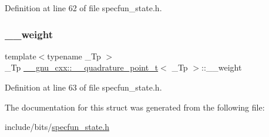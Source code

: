 Definition at line 62 of file specfun\+\_\+state.\+h.

\mbox{\label{struct____gnu__cxx_1_1____quadrature__point__t_a231e04e186e8e45b431876cc958a81c2}} 
\subsubsection{\texorpdfstring{\+\_\+\+\_\+weight}{\_\_weight}}
{\footnotesize\ttfamily template$<$typename \+\_\+\+Tp $>$ \\
\+\_\+\+Tp \hyperlink{struct____gnu__cxx_1_1____quadrature__point__t}{\+\_\+\+\_\+gnu\+\_\+cxx\+::\+\_\+\+\_\+quadrature\+\_\+point\+\_\+t}$<$ \+\_\+\+Tp $>$\+::\+\_\+\+\_\+weight}



Definition at line 63 of file specfun\+\_\+state.\+h.



The documentation for this struct was generated from the following file\+:\begin{DoxyCompactItemize}
\item 
include/bits/\hyperlink{specfun__state_8h}{specfun\+\_\+state.\+h}\end{DoxyCompactItemize}

